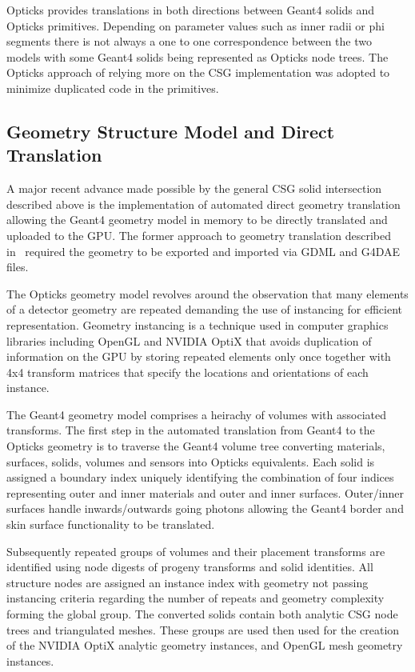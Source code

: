 \documentclass{webofc}
\begin{document}
Opticks provides translations in both directions between Geant4 solids and Opticks primitives.
Depending on parameter values such as inner radii or phi segments there is not always a one to one correspondence 
between the two models with some Geant4 solids being represented as Opticks node trees. The Opticks 
approach of relying more on the CSG implementation was adopted to minimize duplicated code in the primitives.


\subsection{Geometry Structure Model and Direct Translation}

A major recent advance made possible by the general CSG solid intersection 
described above is the implementation of automated direct geometry translation 
allowing the Geant4 geometry model in memory to be directly translated and uploaded to the GPU.
The former approach to geometry translation described in~\cite{chep2016} required the
geometry to be exported and imported via GDML and G4DAE files. 

The Opticks geometry model revolves around the observation that many elements of a detector 
geometry are repeated demanding the use of instancing for efficient representation.  Geometry instancing 
is a technique used in computer graphics libraries including OpenGL and NVIDIA OptiX that avoids 
duplication of information on the GPU by storing repeated elements only once together with 4x4 transform matrices 
that specify the locations and orientations of each instance.

The Geant4 geometry model comprises a heirachy of volumes with associated transforms. The first step in 
the automated translation from Geant4 to the Opticks geometry is to traverse the Geant4 volume tree converting 
materials, surfaces, solids, volumes and sensors into Opticks equivalents. Each solid is assigned 
a boundary index uniquely identifying the combination of four indices representing outer and inner materials and outer and inner surfaces.
Outer/inner surfaces handle inwards/outwards going photons allowing the Geant4 border and skin
surface functionality to be translated. 

Subsequently repeated groups of volumes and their placement transforms are identified using node digests of progeny transforms and solid identities.
All structure nodes are assigned an instance index with geometry not passing instancing criteria regarding the number of repeats 
and geometry complexity forming the global group. The converted solids contain both analytic CSG node trees and triangulated meshes.   
These groups are used then used for the creation of the NVIDIA OptiX analytic geometry instances, and OpenGL mesh geometry instances.  
\end{document}
